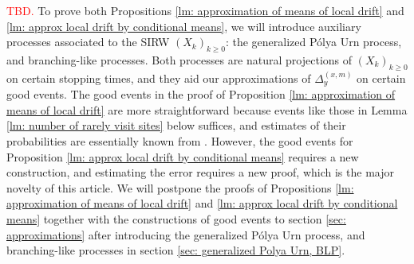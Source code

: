 \documentclass[twoside,12pt,a4paper]{article}
\numberwithin{equation}{section}
\newcommand\TBD{\textcolor{red}{TBD.}}
\begin{document}
	\TBD 
	To prove both Propositions \ref{lm: approximation of means of local drift} and \ref{lm: approx local drift by conditional means}, we will introduce auxiliary processes associated to the SIRW $(X_k)_{k\geq 0}$: the generalized P\'{o}lya Urn process, and branching-like processes. Both processes are natural projections of $(X_k)_{k\geq 0}$ on certain stopping times, and they aid our approximations of $\Delta_{y}^{(x,m)}$ on certain good events. The good events in the proof of Proposition \ref{lm: approximation of means of local drift} are more straightforward because events like those in Lemma \ref{lm: number of rarely visit sites} below suffices, and estimates of their probabilities are essentially known from \cite{KMP22}. However, the good events for Proposition \ref{lm: approx local drift by conditional means} requires a new construction, and estimating the error requires a new proof, which is the major novelty of this article. We will postpone the proofs of Propositions \ref{lm: approximation of means of local drift} and \ref{lm: approx local drift by conditional means} together with the constructions of good events to section \ref{sec: approximations} after introducing the generalized P\'{o}lya Urn process, and branching-like processes in section \ref{sec: generalized Polya Urn, BLP}.
	
	
\end{document}
